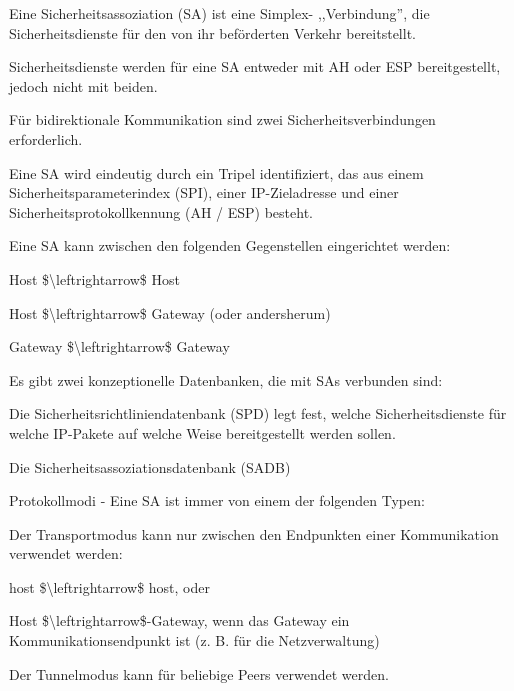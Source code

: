\documentclass[a4paper]{article}
\begin{document}
\begin{multicols}{3}
\begin{itemize*}
\begin{itemize*}
            \end{itemize*}
            \item Eine Sicherheitsassoziation (SA) ist eine Simplex- ,,Verbindung'', die Sicherheitsdienste für den von ihr beförderten Verkehr bereitstellt.
            \begin{itemize*}
                  \item Sicherheitsdienste werden für eine SA entweder mit AH oder ESP bereitgestellt, jedoch nicht mit beiden.
                  \item Für bidirektionale Kommunikation sind zwei Sicherheitsverbindungen erforderlich.
                  \item Eine SA wird eindeutig durch ein Tripel identifiziert, das aus einem Sicherheitsparameterindex (SPI), einer IP-Zieladresse und einer Sicherheitsprotokollkennung (AH / ESP) besteht.
                  \item Eine SA kann zwischen den folgenden Gegenstellen eingerichtet werden:
                  \begin{itemize*} \item Host \$\textbackslash leftrightarrow\$ Host \item Host \$\textbackslash leftrightarrow\$ Gateway (oder andersherum) \item Gateway \$\textbackslash leftrightarrow\$ Gateway \end{itemize*}
                  \item Es gibt zwei konzeptionelle Datenbanken, die mit SAs verbunden sind:
                  \begin{itemize*} \item Die Sicherheitsrichtliniendatenbank (SPD) legt fest, welche Sicherheitsdienste für welche IP-Pakete auf welche Weise bereitgestellt werden sollen. \item Die Sicherheitsassoziationsdatenbank (SADB) \end{itemize*}
            \end{itemize*}
            \item Protokollmodi - Eine SA ist immer von einem der folgenden Typen:
            \begin{itemize*}
                  \item Der Transportmodus kann nur zwischen den Endpunkten einer Kommunikation verwendet werden:
                  \begin{itemize*} \item host \$\textbackslash leftrightarrow\$ host, oder \item Host \$\textbackslash leftrightarrow\$-Gateway, wenn das Gateway ein Kommunikationsendpunkt ist (z. B. für die Netzverwaltung) \end{itemize*}
                  \item Der Tunnelmodus kann für beliebige Peers verwendet werden.
            \end{itemize*}
      \end{itemize*}


\end{multicols}
\end{document}
